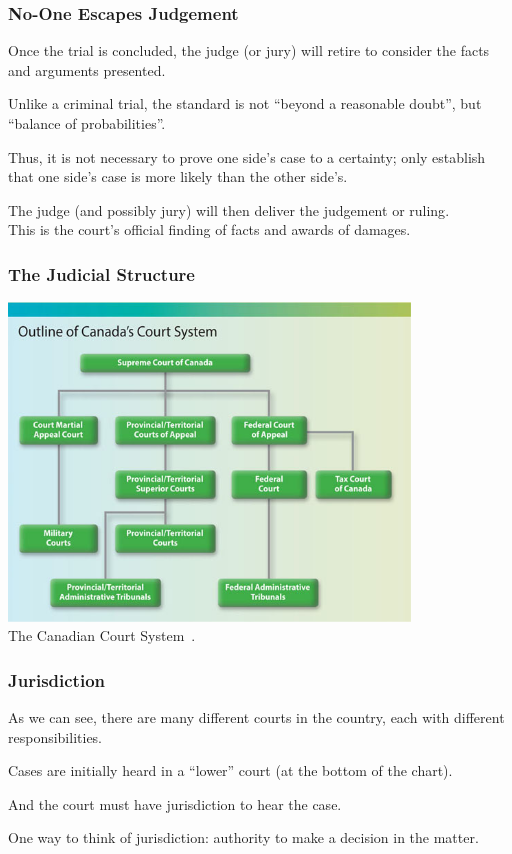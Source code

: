 \begin{frame}
\frametitle{No-One Escapes Judgement}

Once the trial is concluded, the judge (or jury) will retire to consider the facts and arguments presented.

Unlike a criminal trial, the standard is not ``beyond a reasonable doubt'', but ``balance of probabilities''.

Thus, it is not necessary to prove one side's case to a certainty; only establish that one side's case is more likely than the other side's.


The judge (and possibly jury) will then deliver the \alert{judgement} or \alert{ruling}.\\
\quad This is the court's official finding of facts and awards of damages.



\end{frame}


\begin{frame}
\frametitle{The Judicial Structure}

\begin{center}
	\includegraphics[width=0.8\textwidth]{images/courts.jpg}\\
	The Canadian Court System~\cite{just07}.
\end{center}

\end{frame}



\begin{frame}
\frametitle{Jurisdiction}

As we can see, there are many different courts in the country, each with different responsibilities.

Cases are initially heard in a ``lower'' court (at the bottom of the chart).

And the court must have \alert{jurisdiction} to hear the case.

One way to think of jurisdiction: authority to make a decision in the matter.

\end{frame}




